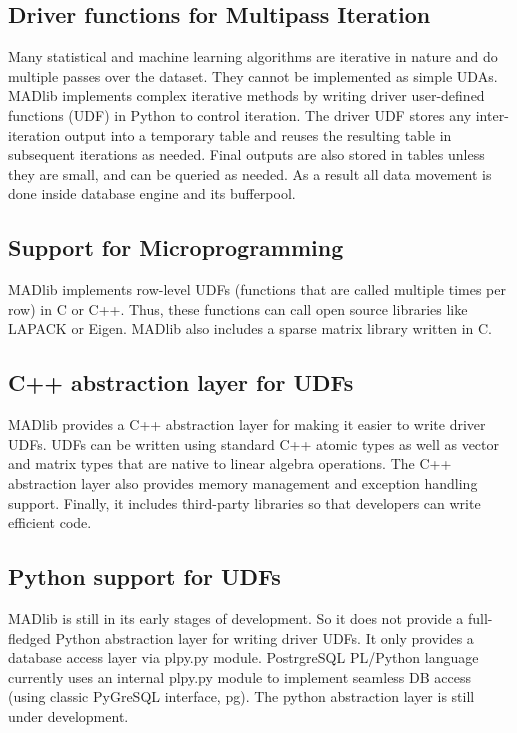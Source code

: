 \subsection*{Driver functions for Multipass Iteration}
Many statistical and machine learning algorithms are iterative in nature and do multiple passes over the dataset. They cannot be implemented as simple UDAs. MADlib implements complex iterative methods by writing driver user-defined functions (UDF) in Python to control iteration. The driver UDF stores any inter-iteration output into a temporary table and reuses the resulting table in subsequent iterations as needed. Final outputs are also stored in tables unless they are small, and can be queried as needed. As a result all data movement is done inside database engine and its bufferpool.

\subsection*{Support for Microprogramming}
MADlib implements row-level UDFs (functions that are called multiple times per row) in C or C++. Thus, these functions can call open source libraries like LAPACK or Eigen. MADlib also includes a sparse matrix library written in C.

\subsection*{C++ abstraction layer for UDFs} 
MADlib provides a C++ abstraction layer for making it easier to write driver UDFs. UDFs can be written using standard C++ atomic types as well as vector and matrix types that are native to linear algebra operations. The C++ abstraction layer also provides memory management and exception handling support. Finally, it includes third-party libraries so that developers can write efficient code.

\subsection*{Python support for UDFs}
MADlib is still in its early stages of development. So it does not provide a full-fledged Python abstraction layer for writing driver UDFs. It only provides a database access layer via {\ttfamily plpy.py} module. PostrgreSQL PL/Python language currently uses an internal plpy.py module to implement seamless DB access (using classic PyGreSQL interface, pg). The python abstraction layer is still under development.

